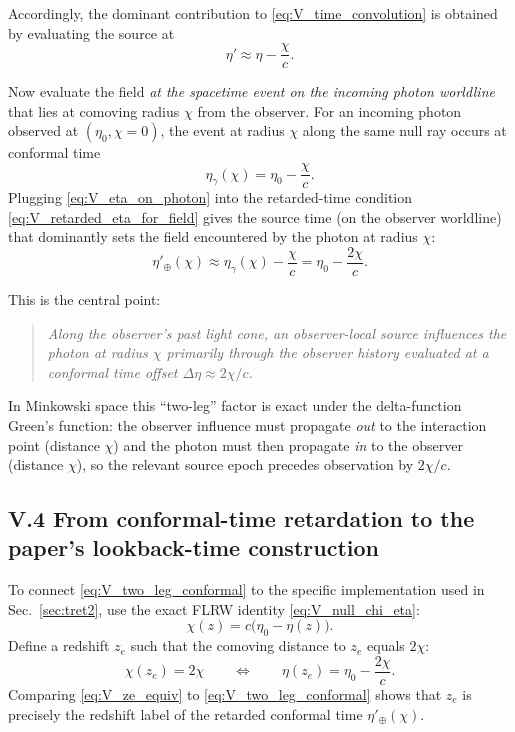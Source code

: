 \documentclass[10pt]{article}
\newcommand{\chis}{\chi}
\begin{document}
Accordingly, the dominant contribution to \eqref{eq:V_time_convolution} is obtained by evaluating
the source at
\begin{equation}
\eta' \approx \eta - \frac{\chis}{c}.
\label{eq:V_retarded_eta_for_field}
\end{equation}

Now evaluate the field \emph{at the spacetime event on the incoming photon worldline} that lies at
comoving radius $\chis$ from the observer.
For an incoming photon observed at $(\eta_0,\chis=0)$, the event at radius $\chis$ along the same
null ray occurs at conformal time
\begin{equation}
\eta_{\gamma}(\chis) = \eta_0 - \frac{\chis}{c}.
\label{eq:V_eta_on_photon}
\end{equation}
Plugging \eqref{eq:V_eta_on_photon} into the retarded-time condition \eqref{eq:V_retarded_eta_for_field}
gives the source time (on the observer worldline) that dominantly sets the field encountered by the photon at radius $\chis$:
\begin{equation}
\eta'_\oplus(\chis)
\approx
\eta_{\gamma}(\chis) - \frac{\chis}{c}
=
\eta_0 - \frac{2\chis}{c}.
\label{eq:V_two_leg_conformal}
\end{equation}

This is the central point:
\begin{quote}
\emph{Along the observer’s past light cone, an observer-local source influences the photon at radius $\chis$
primarily through the observer history evaluated at a conformal time offset $\Delta\eta \approx 2\chis/c$.}
\end{quote}

In Minkowski space this ``two-leg'' factor is exact under the delta-function Green's function: the
observer influence must propagate \emph{out} to the interaction point (distance $\chis$) and the
photon must then propagate \emph{in} to the observer (distance $\chis$), so the relevant source
epoch precedes observation by $2\chis/c$.

\subsection{V.4 From conformal-time retardation to the paper’s lookback-time construction}
\label{app:tret_green:chi_ze}

To connect \eqref{eq:V_two_leg_conformal} to the specific implementation used in Sec.~\ref{sec:tret2},
use the exact FLRW identity \eqref{eq:V_null_chi_eta}:
\begin{equation}
\chis(z) = c\bigl(\eta_0-\eta(z)\bigr).
\label{eq:V_chi_eta_recall}
\end{equation}
Define a redshift $z_e$ such that the comoving distance to $z_e$ equals $2\chis$:
\begin{equation}
\chis(z_e) = 2\chis
\qquad\Longleftrightarrow\qquad
\eta(z_e) = \eta_0 - \frac{2\chis}{c}.
\label{eq:V_ze_equiv}
\end{equation}
Comparing \eqref{eq:V_ze_equiv} to \eqref{eq:V_two_leg_conformal} shows that $z_e$ is precisely the
redshift label of the retarded conformal time $\eta'_\oplus(\chis)$.
\end{document}
